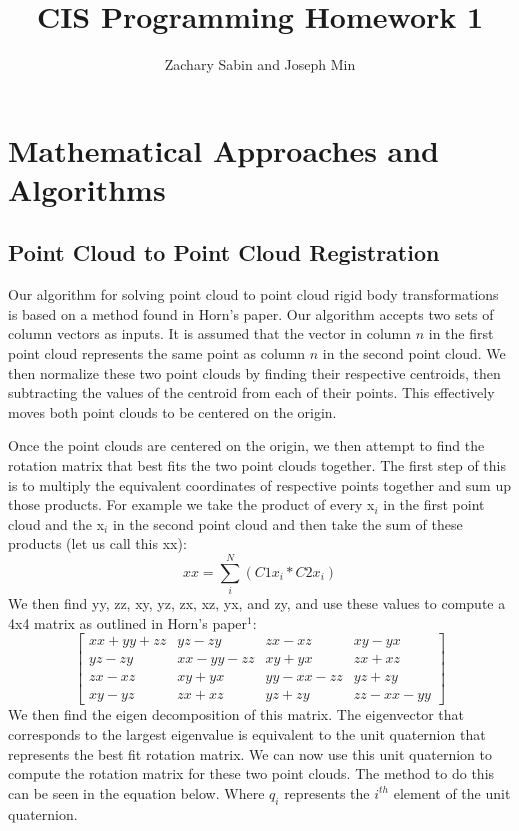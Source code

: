\documentclass[a4paper]{article}
\title{CIS Programming Homework 1}
\author{Zachary Sabin and Joseph Min}
\begin{document}
\maketitle

\section{Mathematical Approaches and Algorithms}
\subsection{Point Cloud to Point Cloud Registration}
Our algorithm for solving point cloud to point cloud rigid body transformations is based on a method found in Horn's paper. Our algorithm accepts two sets of column vectors as inputs. It is assumed that the vector in column $n$ in the first point cloud represents the same point as column $n$ in the second point cloud. We then normalize these two point clouds by finding their respective centroids, then subtracting the values of the centroid from each of their points. This effectively moves both point clouds to be centered on the origin.

Once the point clouds are centered on the origin, we then attempt to find the rotation matrix that best fits the two point clouds together. The first step of this is to multiply the equivalent coordinates of respective points together and sum up those products. For example we take the product of every x$_i$ in the first point cloud and the x$_i$ in the second point cloud and then take the sum of these products (let us call this xx):
\[xx = \sum_{i}^{N}(C1x_i*C2x_i)\]
We then find yy, zz, xy, yz, zx, xz, yx, and zy, and use these values to compute a 4x4 matrix as outlined in Horn’s paper$^1$:
\[
\begin{bmatrix}
    xx+yy+zz & yz-zy & zx-xz  & xy-yx \\
    yz-zy & xx-yy-zz & xy+yx & zx+xz \\
    zx-xz & xy+yx & yy-xx-zz & yz+zy \\
    xy-yz & zx+xz & yz+zy & zz-xx-yy
\end{bmatrix}
\]
We then find the eigen decomposition of this matrix. The eigenvector that corresponds to the largest eigenvalue is equivalent to the unit quaternion that represents the best fit rotation matrix. We can now use this unit quaternion to compute the rotation matrix for these two point clouds. The method to do this can be seen in the equation below. Where $q_i$ represents the $i^{th}$ element of the unit quaternion.
\end{document}
